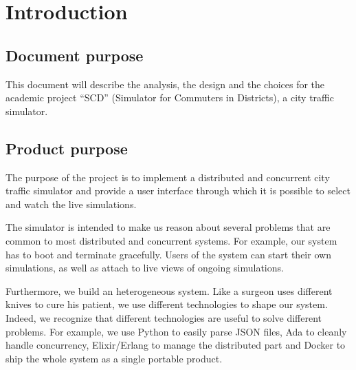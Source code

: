 \section{Introduction}
\subsection{Document purpose}
This document will describe the analysis, the design and the choices for the
academic project ``SCD'' (Simulator for Commuters in Districts), a city traffic
simulator.

\subsection{Product purpose}\label{productPurpose}
The purpose of the project is to implement a distributed and concurrent city
traffic simulator and provide a user interface through which it is possible to
select and watch the live simulations.

The simulator is intended to make us reason about several problems that
are common to most distributed and concurrent systems. For
example, our system has to boot and terminate gracefully.
Users of the system can start their own simulations, as well as attach to live
views of ongoing simulations.

Furthermore, we build an heterogeneous system.
Like a surgeon uses different knives to cure his patient, we use different
technologies to shape our system.
Indeed, we recognize that different technologies are useful to solve
different problems. For example, we use Python to easily parse JSON files,
Ada to cleanly handle concurrency, Elixir/Erlang to manage
the distributed part and Docker to ship the whole system as a
single portable product.
